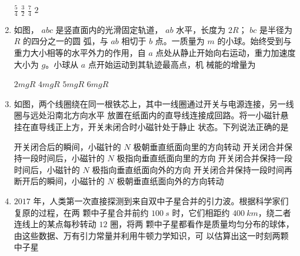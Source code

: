 \begin{enumerate}
\begin{figure}[h!]
\centering

\end{figure}


\fourchoices
{$ \frac{ 5 }{ 4 } $}
{$ \frac{ 3 }{ 2 } $}
{$ \frac{ 7 }{ 4 } $}
{$ 2 $}


\banswer{

}


\newpage
\item
如图， $ abc $ 是竖直面内的光滑固定轨道， $ ab $ 水平，长度为 $ 2R $； $ bc $ 是半径为 $ R $ 的四分之一的圆
弧，与 $ ab $ 相切于 $ b $ 点。一质量为 $ m $ 的小球。始终受到与重力大小相等的水平外力的作用，自
$ a $ 点处从静止开始向右运动，重力加速度大小为 $ g $。小球从 $ a $ 点开始运动到其轨迹最高点，机
械能的增量为  

\begin{figure}[h!]
\centering

\end{figure}

\fourchoices
{$ 2 mgR $}
{$ 4 mgR $}
{$ 5 mgR $}
{$ 6 mgR $}


\banswer{

}

\item
如图，两个线圈绕在同一根铁芯上，其中一线圈通过开关与电源连接，另一线圈与远处沿南北方向水平
放置在纸面内的直导线连接成回路。将一小磁针悬挂在直导线正上方，开关未闭合时小磁针处于静止
状态。下列说法正确的是  

\begin{figure}[h!]
\centering

\end{figure}

\fourchoices
{开关闭合后的瞬间，小磁针的 $ N $ 极朝垂直纸面向里的方向转动}
{开关闭合并保持一段时间后，小磁针的 $ N $ 极指向垂直纸面向里的方向}
{开关闭合并保持一段时间后，小磁针的 $ N $ 极指向垂直纸面向外的方向}
{开关闭合并保持一段时间再断开后的瞬间，小磁针的 $ N $ 极朝垂直纸面向外的方向转动}

\banswer{

}


\newpage

\item 
$ 2017 $ 年，人类第一次直接探测到来自双中子星合并的引力波。根据科学家们复原的过程，在两
颗中子星合并前约 $ 100 \ s $ 时，它们相距约 $ 400 \ km $，绕二者连线上的某点每秒转动 $ 12 $ 圈，将两
颗中子星都看作是质量均匀分布的球体，由这些数据、万有引力常量并利用牛顿力学知识，可
以估算出这一时刻两颗中子星  



\end{enumerate}
